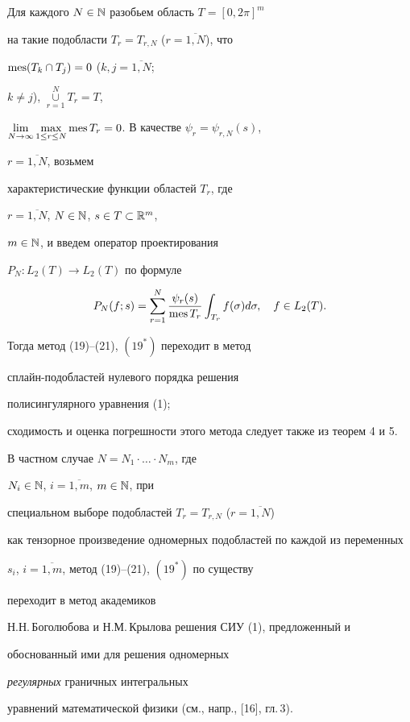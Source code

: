 \begin{note}


Для каждого $ N\in \Bbb{N} $ разобьем область $ T=[0,2\pi ]^m $


на такие подобласти $T_r=T_{r,N}$ ($r=\overline{1,N}$), что


$\operatorname{mes} (T_k\cap T_j)=0$ ($k, j=\overline{1,N}$; 


$k\ne j$), $\mathop{\cup}\limits_{r=1}^NT_r=T$, 


$\lim\limits_{N\rightarrow \infty } \max\limits_{1\leq r\leq N} 


\mes T_r=0$. В качестве $\psi _r=\psi _{r,N}(s)$,


$r=\overline{1,N}$, возьмем


характеристические функции областей $T_r$, где


$r=\overline{1,N}$, $N\in \Bbb{N}$, $s\in T\subset \Bbb{R}^m$, 


$m\in \Bbb{N}$, и введем оператор проектирования


$P_N:L_2(T)\to L_2(T)$ по формуле


$$


P_N (f;s)=\sum_{r=1}^N\frac{\psi _r(s)}{\mes T_r}


\int_{T_r}f(\sigma ) d\sigma ,\quad f\in L_2(T).


$$


Тогда метод (19)--(21), $(19^*)$ переходит в метод


сплайн-подобластей нулевого порядка решения


полисингулярного уравнения (1);


сходимость и оценка погрешности этого метода следует также из теорем 4 и 5.


В частном случае $N=N_1\cdot \dotsc \cdot N_m$, где


$N_i\in \Bbb{N}$, $i=\overline{1,m}$, $m\in \Bbb{N} $, при


специальном выборе подобластей $T_r=T_{r,N}$ ($r=\overline{1,N}$) 


как тензорное произведение одномерных подобластей по каждой из переменных


$s_i$, $i=\overline{1,m}$, метод (19)--(21), $(19^*)$ по существу


переходит в метод академиков


Н.Н.\,Боголюбова и Н.М.\,Крылова решения СИУ (1), предложенный и


обоснованный ими для решения одномерных


{\it регулярных} граничных интегральных


уравнений математической физики (см., напр., [16], гл.\,3).


\end{note}









